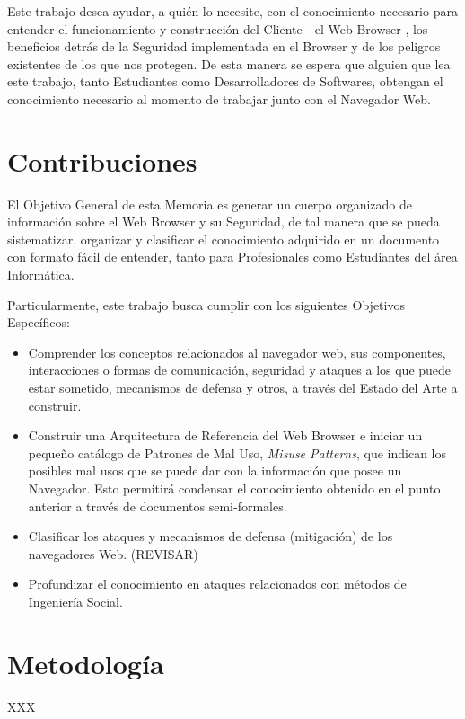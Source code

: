 Este trabajo desea ayudar, a quién lo necesite, con el conocimiento necesario para entender el funcionamiento y construcción del Cliente - el Web Browser-, los beneficios detrás de la Seguridad implementada en el Browser y de los peligros existentes de los que nos protegen. De esta manera se espera que alguien que lea este trabajo, tanto Estudiantes como Desarrolladores de Softwares, obtengan el conocimiento necesario al momento de trabajar junto con el Navegador Web. 



\section{Contribuciones}
\label{chap1:contr}

El Objetivo General de esta Memoria es generar un cuerpo organizado de información sobre el Web Browser y su Seguridad, de tal manera que se pueda sistematizar, organizar y clasificar el conocimiento adquirido en un documento con formato fácil de entender, tanto para Profesionales como Estudiantes del área Informática. 

Particularmente, este trabajo busca cumplir con los siguientes Objetivos Específicos:

\begin{itemize}
	\item Comprender los conceptos relacionados al navegador web, sus componentes, interacciones o formas de comunicación, seguridad y ataques a los que puede estar sometido, mecanismos de defensa y otros, a través del Estado del Arte a construir.
	\item Construir una Arquitectura de Referencia del Web Browser e iniciar un pequeño catálogo de Patrones de Mal Uso, \textit{Misuse Patterns}, que indican los posibles mal usos que se puede dar con la información que posee un Navegador. Esto permitirá condensar el conocimiento obtenido en el punto anterior a través de documentos semi-formales.
	\item Clasificar los ataques y mecanismos de defensa (mitigación) de los navegadores Web. (REVISAR)
	\item Profundizar el conocimiento en ataques relacionados con métodos de Ingeniería Social.
	
\end{itemize} 


\section{Metodología}
\label{chap1:Met}
XXX


